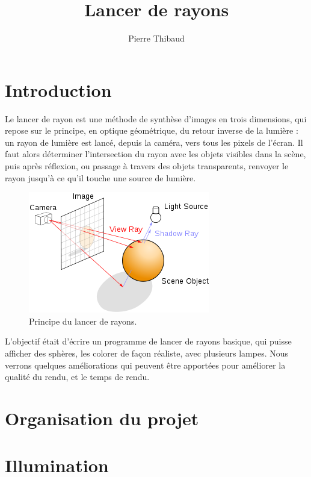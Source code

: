 \documentclass[10pt,a4paper]{article}
\author{Pierre \bsc{Donat-Bouillud} Thibaud \bsc{Ehret}}
\title{Lancer de rayons}
\begin{document}
\maketitle

\section*{Introduction} %
Le lancer de rayon est une méthode de synthèse d'images en trois dimensions, qui repose sur le principe, en optique géométrique, du retour 
inverse de la lumière : un rayon de lumière est lancé, depuis la caméra, vers tous les pixels de l'écran. Il faut alors déterminer l'intersection
du rayon avec les objets visibles dans la scène, puis après réflexion, ou passage à travers des objets transparents, renvoyer le rayon jusqu'à ce
qu'il touche une source de lumière.
\begin{figure}[!h]
\begin{center}
\includegraphics[scale=0.5]{../presentation/raytracing.png}
\end{center}
\caption{Principe du lancer de rayons.}
\end{figure}
L'objectif était d'écrire un programme de lancer de rayons basique, qui puisse afficher des sphères, les colorer de façon réaliste, avec plusieurs lampes.
Nous verrons quelques améliorations qui peuvent être apportées pour améliorer la qualité du rendu, et le temps de rendu.

\tableofcontents

\section{Organisation du projet} %



\section{Illumination} %

\end{document}

